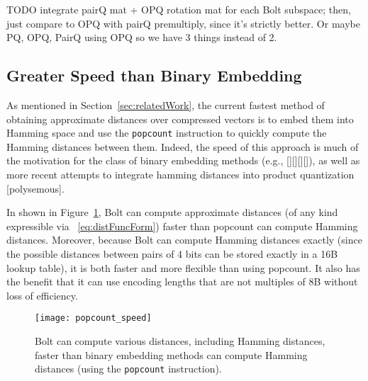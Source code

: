 TODO integrate pairQ mat + OPQ rotation mat for each Bolt subspace; then, just compare to OPQ with pairQ premultiply, since it's strictly better. Or maybe PQ, OPQ, PairQ using OPQ so we have 3 things instead of 2.


\subsection{Greater Speed than Binary Embedding}

As mentioned in Section~\ref{sec:relatedWork}, the current fastest method of obtaining approximate distances over compressed vectors is to embed them into Hamming space and use the \texttt{popcount} instruction to quickly compute the Hamming distances between them. Indeed, the speed of this approach is much of the motivation for the class of binary embedding methods (e.g., [][][][]), as well as more recent attempts to integrate hamming distances into product quantization [polysemous].

In shown in Figure~\ref{fig:bolt_vs_popcount}, Bolt can compute approximate distances (of any kind expressible via ~\ref{eq:distFuncForm}) faster than popcount can compute Hamming distances. Moreover, because Bolt can compute Hamming distances exactly (since the possible distances between pairs of 4 bits can be stored exactly in a 16B lookup table), it is both faster and more flexible than using popcount. It also has the benefit that it can use encoding lengths that are not multiples of 8B without loss of efficiency.

\begin{figure}[h]
\begin{center}
\label{fig:bolt_vs_popcount}
\texttt{[image: popcount\_speed]}
\caption{Bolt can compute various distances, including Hamming distances, faster than binary embedding methods can compute Hamming distances (using the \texttt{popcount} instruction).}
\end{center}
\end{figure}


